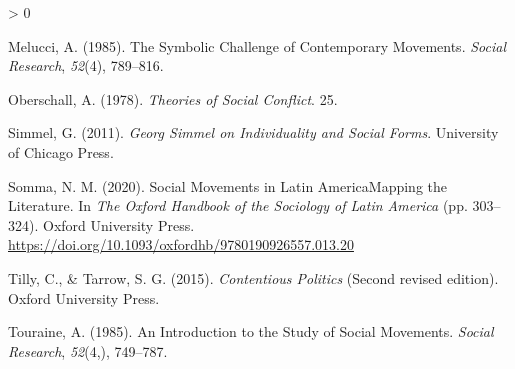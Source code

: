 \documentclass[
  12pt,
]{article}
\newlength{\cslhangindent}
\newenvironment{CSLReferences}[2] %
 {%
  \setlength{\parindent}{0pt}
  \ifodd #1 \everypar{\setlength{\hangindent}{\cslhangindent}}\ignorespaces\fi
  \ifnum #2 > 0
  \setlength{\parskip}{#2\baselineskip}
  \fi
 }%
 {}
\begin{document}
\begin{CSLReferences}{1}{0}
\leavevmode\hypertarget{ref-melucciSymbolicChallengeContemporary1985}{}%
Melucci, A. (1985). The {Symbolic Challenge} of {Contemporary
Movements}. \emph{Social Research}, \emph{52}(4), 789--816.

\leavevmode\hypertarget{ref-oberschallTheoriesSocialConflict1978}{}%
Oberschall, A. (1978). \emph{Theories of {Social Conflict}}. 25.

\leavevmode\hypertarget{ref-simmelGeorgSimmelIndividuality2011}{}%
Simmel, G. (2011). \emph{Georg {Simmel} on {Individuality} and {Social
Forms}}. {University of Chicago Press}.

\leavevmode\hypertarget{ref-sommaSocialMovementsLatin2020}{}%
Somma, N. M. (2020). Social {Movements} in {Latin AmericaMapping} the
{Literature}. In \emph{The {Oxford Handbook} of the {Sociology} of
{Latin America}} (pp. 303--324). {Oxford University Press}.
\url{https://doi.org/10.1093/oxfordhb/9780190926557.013.20}

\leavevmode\hypertarget{ref-tillyContentiousPolitics2015a}{}%
Tilly, C., \& Tarrow, S. G. (2015). \emph{Contentious {Politics}}
(Second revised edition). {Oxford University Press}.

\leavevmode\hypertarget{ref-touraineIntroductionStudySocial1985}{}%
Touraine, A. (1985). An {Introduction} to the {Study} of {Social
Movements}. \emph{Social Research}, \emph{52}(4,), 749--787.

\end{CSLReferences}
\end{document}
